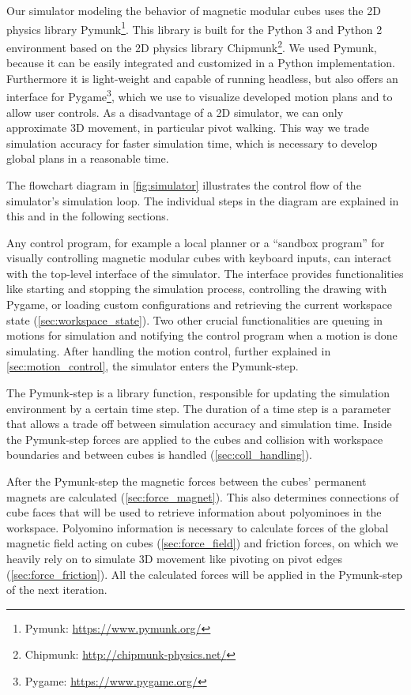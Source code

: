 Our simulator modeling the behavior of magnetic modular cubes uses the 2D physics library Pymunk\footnote{Pymunk: \url{https://www.pymunk.org/}}.
This library is built for the Python 3 and Python 2 environment based on the 2D physics library Chipmunk\footnote{Chipmunk: \url{http://chipmunk-physics.net/}}.
We used Pymunk, because it can be easily integrated and customized in a Python implementation.
Furthermore it is light-weight and capable of running headless, but also offers an interface for Pygame\footnote{Pygame: \url{https://www.pygame.org/}}, which we use to visualize developed motion plans and to allow user controls.
As a disadvantage of a 2D simulator, we can only approximate 3D movement, in particular pivot walking.
This way we trade simulation accuracy for faster simulation time, which is necessary to develop global plans in a reasonable time.

The flowchart diagram in \autoref{fig:simulator} illustrates the control flow of the simulator's simulation loop.
The individual steps in the diagram are explained in this and in the following sections.

Any control program, for example a local planner or a ``sandbox program'' for visually controlling magnetic modular cubes with keyboard inputs, can interact with the top-level interface of the simulator.
The interface provides functionalities like starting and stopping the simulation process, controlling the drawing with Pygame, or loading custom configurations and retrieving the current workspace state (\autoref{sec:workspace_state}).
Two other crucial functionalities are queuing in motions for simulation and notifying the control program when a motion is done simulating.
After handling the motion control, further explained in \autoref{sec:motion_control}, the simulator enters the Pymunk-step.

The Pymunk-step is a library function, responsible for updating the simulation environment by a certain time step.
The duration of a time step is a parameter that allows a trade off between simulation accuracy and simulation time. 
Inside the Pymunk-step forces are applied to the cubes and collision with workspace boundaries and between cubes is handled (\autoref{sec:coll_handling}).

After the Pymunk-step the magnetic forces between the cubes' permanent magnets are calculated (\autoref{sec:force_magnet}).
This also determines connections of cube faces that will be used to retrieve information about polyominoes in the workspace.
Polyomino information is necessary to calculate forces of the global magnetic field acting on cubes (\autoref{sec:force_field}) and friction forces, on which we heavily rely on to simulate 3D movement like pivoting on pivot edges (\autoref{sec:force_friction}).
All the calculated forces will be applied in the Pymunk-step of the next iteration.

